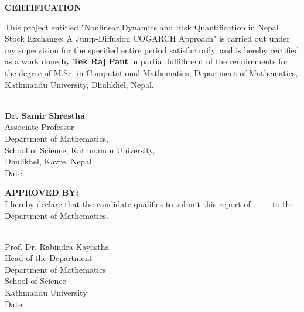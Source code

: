 



\begin{center}
	{\Large{\bf{ CERTIFICATION}}}
\end{center}


\noindent
This project entitled "Nonlinear Dynamics and Risk Quantification in Nepal Stock Exchange: A Jump-Diffusion COGARCH Approach" is carried out  under my supervision for the specified entire period satisfactorily, and is hereby certified as a work done by  \textbf{Tek Raj Pant} in partial fulfillment of the requirements for the degree of M.Sc. in Computational Mathematics, Department of Mathematics, Kathmandu University,  Dhulikhel, Nepal.

\vspace{2.0cm}


\noindent
-----------------------------\\
{\bf Dr. Samir Shrestha}\\
Associate Professor \\
Department of Mathematics,\\
School of Science, Kathmandu University,\\
Dhulikhel, Kavre, Nepal\\
Date:

\vspace{2cm}

\noindent
{\bf APPROVED BY:}\\
I hereby declare that the candidate qualifies to submit this  report of ------ 
to the Department of Mathematics. 


\noindent
-----------------------------\\
Prof. Dr. Rabindra Kayastha\\
Head of the Department\\
Department of Mathematics\\
School of Science\\
Kathmandu University\\
Date:
  